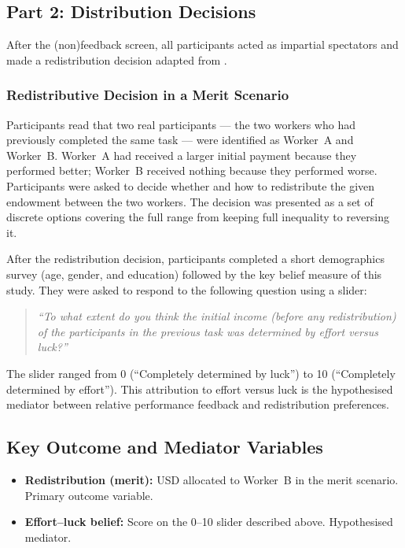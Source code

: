 \documentclass[12pt]{article}
\begin{document}
\subsection{Part 2: Distribution Decisions}
\label{sec:distdecisions}

After the (non)feedback screen, all participants acted as impartial spectators and
made a redistribution decision adapted from \citet{Almas2020}.

\subsubsection*{Redistributive Decision in a Merit Scenario}

Participants read that two real participants --- the two workers who had
previously completed the same task --- were identified as Worker~A and
Worker~B.
Worker~A had received a larger initial payment because they performed better;
Worker~B received nothing because they performed worse.
Participants were asked to decide whether and how to redistribute the given endowment
between the two workers.
The decision was presented as a set of discrete options covering
the full range from keeping full inequality to reversing it.

After the redistribution decision, participants completed a short demographics
survey (age, gender, and education) followed by the key belief measure of
this study.
They were asked to respond to the following question using a slider:

\begin{quote}
\textit{``To what extent do you think the initial income (before any redistribution) of the participants
in the previous task was determined by effort versus luck?''}
\end{quote}

\noindent The slider ranged from 0 (``Completely determined by luck'') to
10 (``Completely determined by effort'').
This attribution to effort versus luck is the hypothesised mediator between
relative performance feedback and redistribution preferences.

\subsection{Key Outcome and Mediator Variables}

\begin{itemize}
  \item \textbf{Redistribution (merit):} USD allocated to Worker~B in the
    merit scenario. Primary outcome variable.
  \item \textbf{Effort--luck belief:} Score on the
    0--10 slider described above. Hypothesised mediator.
\end{itemize}
\end{document}
